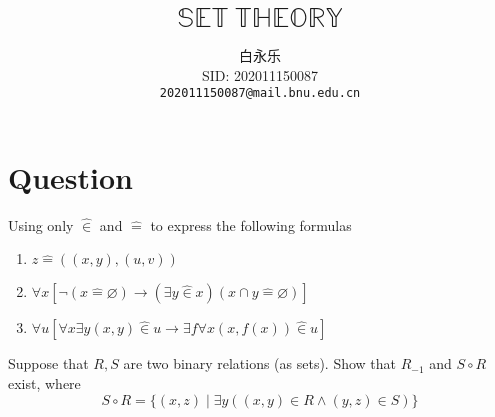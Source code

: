 \documentclass{ctexart}
\theoremstyle{remark}
\def\email#1{{\texttt{#1}}}
\newtheorem{prob}{\begin{tikzpicture}[baseline]%
\node at (-0.02em,0.3em) {$\mathbb{P}$};%
\node[scale=0.7] at (0.2em,-0.0em) {R};%
\node[scale=0.7] at (0.6em,0.4em) {O};%
\node[scale=0.8] at (1.05em,0.25em) {B};%
\node at (1.55em,0.3em) {L};%
\node[scale=0.7] at (1.75em,0.45em) {E};%
\node at (2.35em,0.3em) {M};%
\end{tikzpicture}}
\newenvironment{problem}{\color{blue}\begin{prob}}{\end{prob}}
\newcommand\<{\langle}
\renewcommand\>{\rangle}
\newcommand{\hin}{\hat{\in}}
\newcommand{\fun}[2]{{}^{#1}#2}
\begin{document}
\title{$\mathbb{SET\ THEORY}$}
\author{白永乐\\ %
SID: 202011150087\\ %
\email{202011150087@mail.bnu.edu.cn}} %
\maketitle
\section{Question}
\iffalse
\begin{problem}
Show that $\varnothing$ exists and is unique.
\end{problem}
\begin{problem}
Verify that
$$
\forall x \forall y \forall x^{\prime} \forall y^{\prime}\left((x, y)=\left(x^{\prime}, y^{\prime}\right) \rightarrow x=x^{\prime} \wedge y=y^{\prime}\right) .
$$
By induction, ordered $n$-tuples can be defined as follows:
$$
\left(x_1, \ldots, x_{n+1}\right)=\left(\left(x_1, \ldots, x_n\right), x_{n+1}\right) .
$$
Show that two ordered $n$-tuples $\left(x_1, \ldots, x_n\right)$ and $\left(y_1, \ldots, y_n\right)$ are equal iff $x_i=y_i$ for all $i=1, \ldots, n$.
\end{problem}
\begin{problem}
Show that if $R$ is a set, then $\operatorname{dom}(R)$ and $\operatorname{ran}(R)$ are sets. (In fact, field $(R)=\bigcup \bigcup R$).
\end{problem}
\begin{problem}
Show that if $X, Y$ are sets then $\fun{X}{Y}$ is also a set.
\end{problem}
\fi
\begin{problem}
Using only $\hat{\in}$ and $\hat{=}$ to express the following formulas
\begin{enumerate}
\item $z \hat{=}((x, y),(u, v))$
\item
$\forall x[\neg(x \hat{=} \varnothing) \rightarrow(\exists y \hat{\in} x)(x \cap y \hat{=} \varnothing)]$
\item
$\forall u[\forall x \exists y(x, y) \hin u \rightarrow \exists f \forall x(x, f(x)) \hat{\in} u]$
\end{enumerate}
\end{problem}

\begin{problem}
Suppose that $R, S$ are two binary relations (as sets). Show that $R_{-1}$ and $S \circ R$ exist, where
$$
S \circ R=\{(x, z) \mid \exists y((x, y) \in R \wedge(y, z) \in S)\}
$$
\end{problem}
\end{document}
